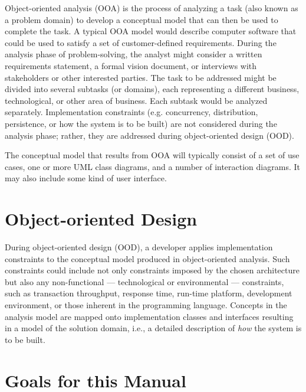 \documentclass [11pt]{book}
\begin{document}
Object-oriented analysis (OOA) is the process of analyzing
       a task (also known as a problem domain) to develop a conceptual
       model that can then be used to complete the task. A typical OOA
       model would describe computer software that could be used to
       satisfy a set of customer-defined requirements. During the
       analysis phase of problem-solving, the analyst might consider a
       written requirements statement, a formal vision document, or
       interviews with stakeholders or other interested parties. The
       task to be addressed might be divided into several subtasks (or
       domains), each representing a different business,
       technological, or other area of business. Each subtask would be
       analyzed separately. Implementation
       constraints (e.g. concurrency, distribution, persistence, or
       how the system is to be built) are not considered during the
       analysis phase; rather, they are addressed during
       object-oriented design (OOD).



The conceptual model that results from OOA will typically consist of a
set of use cases, one or more UML class diagrams, and a number of
interaction diagrams. It may also include some kind of user interface.



\section{Object-oriented Design}

\label{sec:object-orienteddesign}

During object-oriented design (OOD), a developer applies implementation constraints
to the conceptual model produced in object-oriented analysis. Such constraints could include
not only constraints imposed by the chosen architecture but also any non-functional --- 
technological or environmental --- constraints, such as transaction throughput, response time,
run-time platform, development environment, or those inherent in the programming language. Concepts
in the analysis model are mapped onto implementation classes and interfaces resulting in
a model of the solution domain, i.e., a detailed description of \emph{how} the system is to be built.

\section{Goals for this Manual}
\end{document}
